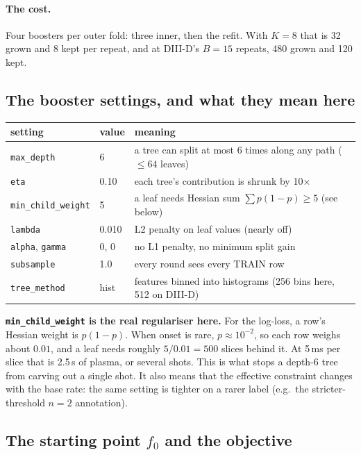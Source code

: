 \documentclass[11pt]{article}
\begin{document}
\paragraph{The cost.} Four boosters per outer fold: three inner, then the
refit. With $K=8$ that is 32 grown and 8 kept per repeat, and at DIII-D's
$B=15$ repeats, 480 grown and 120 kept.

\subsection{The booster settings, and what they mean here}

\begin{center}\small
\begin{tabular}{lll}
\toprule
setting & value & meaning \\
\midrule
\texttt{max\_depth} & 6 & a tree can split at most 6 times along any path ($\le 64$ leaves)\\
\texttt{eta} & 0.10 & each tree's contribution is shrunk by 10$\times$\\
\texttt{min\_child\_weight} & 5 & a leaf needs Hessian sum $\sum p(1-p)\ge5$ (see below)\\
\texttt{lambda} & 0.010 & L2 penalty on leaf values (nearly off)\\
\texttt{alpha}, \texttt{gamma} & 0, 0 & no L1 penalty, no minimum split gain\\
\texttt{subsample} & 1.0 & every round sees every TRAIN row\\
\texttt{tree\_method} & hist & features binned into histograms (256 bins here, 512 on DIII-D)\\
\bottomrule
\end{tabular}
\end{center}

\textbf{\texttt{min\_child\_weight} is the real regulariser here.} For the
log-loss, a row's Hessian weight is $p(1-p)$. When onset is rare,
$p\approx10^{-2}$, so each row weighs about $0.01$, and a leaf needs roughly
$5/0.01=500$ slices behind it. At 5\,ms per slice that is 2.5\,s of plasma, or
several shots. This is what stops a depth-6 tree from carving out a single
shot. It also means that the effective constraint changes with the base rate:
the same setting is tighter on a rarer label (e.g.\ the stricter-threshold
$n=2$ annotation).

\subsection{The starting point $f_0$ and the objective}\label{sec:base}
\end{document}
